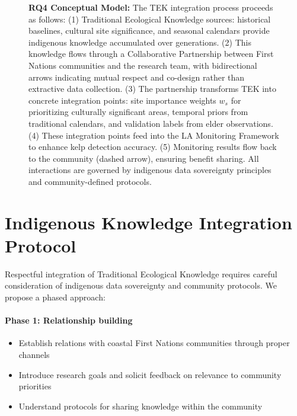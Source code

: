 \documentclass[12pt,oneside]{book}
\begin{document}
\begin{figure}[H]
    \caption{\textbf{RQ4 Conceptual Model:} The TEK integration process proceeds as follows: (1) Traditional Ecological Knowledge sources: historical baselines, cultural site significance, and seasonal calendars provide indigenous knowledge accumulated over generations. (2) This knowledge flows through a Collaborative Partnership between First Nations communities and the research team, with bidirectional arrows indicating mutual respect and co-design rather than extractive data collection. (3) The partnership transforms TEK into concrete integration points: site importance weights $w_s$ for prioritizing culturally significant areas, temporal priors from traditional calendars, and validation labels from elder observations. (4) These integration points feed into the LA Monitoring Framework to enhance kelp detection accuracy. (5) Monitoring results flow back to the community (dashed arrow), ensuring benefit sharing. All interactions are governed by indigenous data sovereignty principles and community-defined protocols.}
    \label{fig:rq4-model}
\end{figure}

\section{Indigenous Knowledge Integration Protocol}
\label{sec:tek-protocol}

Respectful integration of Traditional Ecological Knowledge requires careful consideration of indigenous data sovereignty and community protocols. We propose a phased approach:

\paragraph{Phase 1: Relationship building}
\begin{itemize}
    \item Establish relations with coastal First Nations communities through proper channels
    \item Introduce research goals and solicit feedback on relevance to community priorities
    \item Understand protocols for sharing knowledge within the community
\end{itemize}
\end{document}
